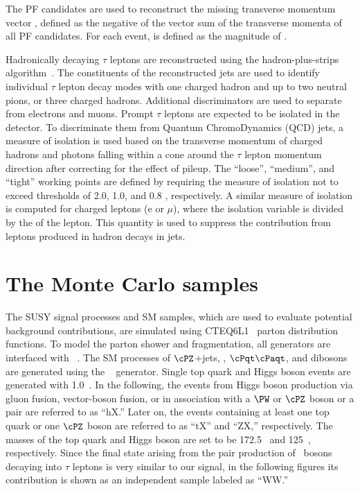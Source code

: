 The PF candidates are used to reconstruct the missing transverse momentum  vector \ptvecmiss, 
defined as the negative of the vector sum of the transverse momenta of all PF candidates.  
For each event, \MPT is defined as the magnitude of \ptvecmiss.

Hadronically decaying $\tau$ leptons are reconstructed using the hadron-plus-strips algorithm~\cite{Khachatryan:2015dfa}.
The constituents of the reconstructed jets are used to identify individual $\tau$ lepton decay modes with one charged 
hadron and up to two neutral pions, or three charged hadrons. 
Additional discriminators are used to separate \Tau from electrons and muons.
Prompt $\tau$ leptons are expected to be isolated in the detector.
To discriminate them from Quantum ChromoDynamics (QCD) jets, a measure of isolation \cite{Khachatryan:2014wca} is used 
based on the transverse momentum of charged hadrons and photons falling within 
a cone around the $\tau$ lepton momentum direction after correcting for the effect of
pileup. The ``loose'', ``medium'', and ``tight'' working points are defined
by requiring the measure of isolation not to exceed thresholds of 2.0, 1.0,
and 0.8 \GeV, respectively.
A similar measure of isolation is computed for charged leptons (e or $\mu$), 
where the isolation variable is divided by the \PT of the lepton. This quantity is 
used to suppress the contribution from leptons produced in hadron decays in jets.

\section{The Monte Carlo samples}
\label{sect:MCSamples}
The SUSY signal processes and SM samples, which are used to evaluate potential background contributions, 
are simulated using CTEQ6L1~\cite{Nadolsky:2008zw} parton distribution functions. 
To model the parton shower and fragmentation, all generators are interfaced with ~\cite{Sjostrand:2006za}.
The SM processes of $\cPZ$+jets, \wjets, $\cPqt\cPaqt$, and dibosons are generated using the ~\cite{Alwall:2011uj} generator. 
Single top quark and Higgs boson events are generated with {\POWHEG} 1.0~\cite{Nason:2004rx,Frixione:2007vw,Alioli:2009je,Alioli:2010xd}.
In the following, the events from Higgs boson production via gluon fusion, vector-boson fusion, or in association with a $\PW$ or $\cPZ$  boson 
or a \ttbar pair are referred to as ``hX.'' Later on, 
the events containing at least one top quark or one $\cPZ$ boson are referred to as ``tX'' and ``ZX,'' respectively. 
The masses of the top quark and Higgs boson are set to be 172.5\GeV~\cite{Khachatryan:2015hba} and 125\GeV~\cite{Aad:2015zhl}, respectively. Since the 
final state arising from the pair production of \PW~bosons decaying into $\tau$ leptons is very similar 
to our signal, in the following figures its contribution is shown as an independent sample labeled as ``WW.''

